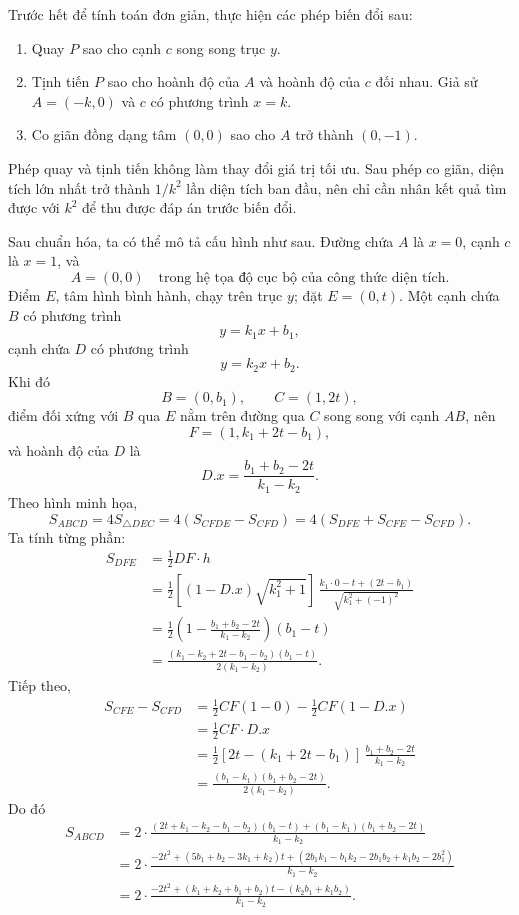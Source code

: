 \documentclass[11pt]{article}
\newcommand{\area}[1]{S_{#1}}
\begin{document}
Trước hết để tính toán đơn giản, thực hiện các phép biến đổi sau:
\begin{enumerate}[label=\alph*)]
  \item Quay \(P\) sao cho cạnh \(c\) song song trục \(y\).
  \item Tịnh tiến \(P\) sao cho hoành độ của \(A\) và hoành độ của \(c\) đối
  nhau. Giả sử \(A=(-k,0)\) và \(c\) có phương trình \(x=k\).
  \item Co giãn đồng dạng tâm \((0,0)\) sao cho \(A\) trở thành \((0,-1)\).
\end{enumerate}
Phép quay và tịnh tiến không làm thay đổi giá trị tối ưu. Sau phép co giãn,
diện tích lớn nhất trở thành \(1/k^2\) lần diện tích ban đầu, nên chỉ cần nhân
kết quả tìm được với \(k^2\) để thu được đáp án trước biến đổi.

Sau chuẩn hóa, ta có thể mô tả cấu hình như sau. Đường chứa \(A\) là
\(x=0\), cạnh \(c\) là \(x=1\), và
\[
  A=(0,0)\quad\text{trong hệ tọa độ cục bộ của công thức diện tích}.
\]
Điểm \(E\), tâm hình bình hành, chạy trên trục \(y\); đặt \(E=(0,t)\). Một
cạnh chứa \(B\) có phương trình
\[
  y=k_1x+b_1,
\]
cạnh chứa \(D\) có phương trình
\[
  y=k_2x+b_2.
\]
Khi đó
\[
  B=(0,b_1),\qquad C=(1,2t),
\]
điểm đối xứng với \(B\) qua \(E\) nằm trên đường qua \(C\) song song với cạnh
\(AB\), nên
\[
  F=(1,k_1+2t-b_1),
\]
và hoành độ của \(D\) là
\[
  D.x=\frac{b_1+b_2-2t}{k_1-k_2}.
\]
Theo hình minh họa,
\[
  \area{ABCD}=4\area{\triangle DEC}
  =4(\area{CFDE}-\area{CFD})
  =4(\area{DFE}+\area{CFE}-\area{CFD}).
\]
Ta tính từng phần:
\[
\begin{aligned}
\area{DFE}
&=\frac12 DF\cdot h\\
&=\frac12\left[(1-D.x)\sqrt{k_1^2+1}\right]\,
  \frac{k_1\cdot0-t+(2t-b_1)}{\sqrt{k_1^2+(-1)^2}}\\
&=\frac12\left(1-\frac{b_1+b_2-2t}{k_1-k_2}\right)(b_1-t)\\
&=\frac{(k_1-k_2+2t-b_1-b_2)(b_1-t)}{2(k_1-k_2)}.
\end{aligned}
\]
Tiếp theo,
\[
\begin{aligned}
\area{CFE}-\area{CFD}
&=\frac12 CF(1-0)-\frac12 CF(1-D.x)\\
&=\frac12 CF\cdot D.x\\
&=\frac12\left[2t-(k_1+2t-b_1)\right]\,
  \frac{b_1+b_2-2t}{k_1-k_2}\\
&=\frac{(b_1-k_1)(b_1+b_2-2t)}{2(k_1-k_2)}.
\end{aligned}
\]
Do đó
\[
\begin{aligned}
\area{ABCD}
&=2\cdot
\frac{(2t+k_1-k_2-b_1-b_2)(b_1-t)
 +(b_1-k_1)(b_1+b_2-2t)}
 {k_1-k_2}\\
&=2\cdot
\frac{-2t^2+(5b_1+b_2-3k_1+k_2)t
 +(2b_1k_1-b_1k_2-2b_1b_2+k_1b_2-2b_1^2)}
 {k_1-k_2}\\
&=2\cdot
\frac{-2t^2+(k_1+k_2+b_1+b_2)t-(k_2b_1+k_1b_2)}
 {k_1-k_2}.
\end{aligned}
\]
\end{document}
